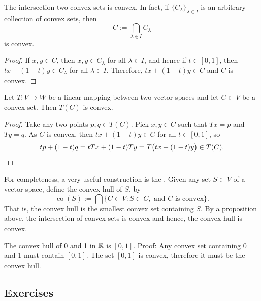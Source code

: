\begin{prop}
The intersection two convex sets is convex.  In fact,
if $\{ C_\lambda \}_{\lambda \in I}$ is
an arbitrary collection of convex sets, then
\begin{equation*}
C := \bigcap_{\lambda \in I} C_\lambda
\end{equation*}
is convex.
\end{prop}

\begin{proof}
If $x, y \in C$, then $x,y \in C_\lambda$ for all
$\lambda \in I$, and hence if $t \in [0,1]$, then $tx + (1-t)y \in
C_\lambda$ for all $\lambda \in I$.  Therefore, $tx + (1-t)y \in C$ and $C$
is convex.
\end{proof}

\begin{prop}
Let $T \colon V \to W$ be a linear mapping between two vector spaces and
let $C \subset V$ be a convex set.  Then $T(C)$ is convex.
\end{prop}

\begin{proof}
Take any two points $p,q \in T(C)$.  Pick $x,y \in C$ such that
$Tx = p$ and $Ty=q$.  As $C$ is convex, then
$tx+(1-t)y \in C$
for all $t \in [0,1]$, so
\begin{equation*}
tp+(1-t)q 
=
tTx+(1-t)Ty
=
T\bigl(tx+(1-t)y\bigr)
\in T(C) .  \qedhere
\end{equation*}
\end{proof}

For completeness, a very useful construction is the
\emph{}.  Given any set $S \subset V$ of a vector
space, define the convex hull of $S$, by
\begin{equation*}
\operatorname{co}(S) :=
\bigcap \{ C \subset V : S \subset C, \text{ and } C \text{ is convex} \} .
\end{equation*}
That is, the convex hull is the smallest convex set containing $S$.  
By a proposition above, the intersection of convex sets is convex and
hence, the convex hull is convex.

\begin{example}
The convex hull of 0 and 1 in ${\mathbb{R}}$ is $[0,1]$.  Proof:
Any convex set containing 0 and 1 must contain $[0,1]$.  The set $[0,1]$
is convex, therefore it must be the convex hull.
\end{example}

\subsection{Exercises}

